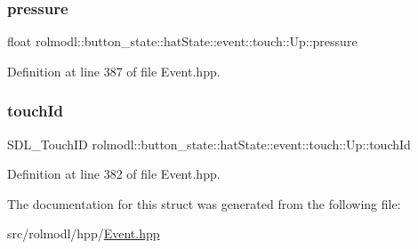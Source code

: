 \subsubsection{\texorpdfstring{pressure}{pressure}}
{\footnotesize\ttfamily float rolmodl\+::button\+\_\+state\+::hat\+State\+::event\+::touch\+::\+Up\+::pressure}



Definition at line 387 of file Event.\+hpp.

\mbox{\label{structrolmodl_1_1button__state_1_1hat_state_1_1event_1_1touch_1_1_up_aa0d0efa35158cf55824c8da292e9f3f7}} 
\subsubsection{\texorpdfstring{touchId}{touchId}}
{\footnotesize\ttfamily S\+D\+L\+\_\+\+Touch\+ID rolmodl\+::button\+\_\+state\+::hat\+State\+::event\+::touch\+::\+Up\+::touch\+Id}



Definition at line 382 of file Event.\+hpp.



The documentation for this struct was generated from the following file\+:\begin{DoxyCompactItemize}
\item 
src/rolmodl/hpp/\mbox{\hyperlink{_event_8hpp}{Event.\+hpp}}\end{DoxyCompactItemize}
